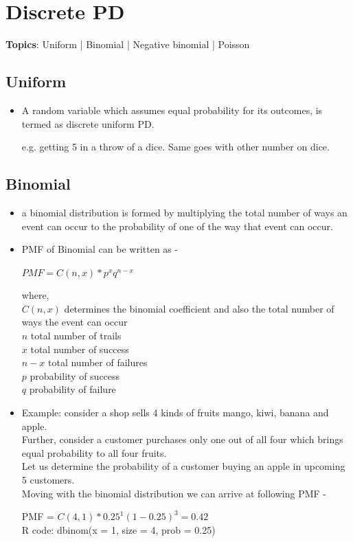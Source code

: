 \documentclass{article}
\begin{document}
\section{Discrete PD}
\textbf{Topics}: Uniform | Binomial | Negative binomial | Poisson

\subsection{Uniform}
\begin{itemize}
	\item A random variable which assumes equal probability for its outcomes, is termed as discrete uniform PD.
	
	e.g. getting 5 in a throw of a dice. Same goes with other number on dice.
\end{itemize}

\subsection{Binomial}
\begin{itemize}
	\item a binomial distribution is formed by multiplying the total number of ways an event can occur to the probability of one of the way that event can occur.
	
	\item PMF of Binomial can be written as -
	
	\begin{center}$PMF = C(n,x)*p^xq^{n-x}$ \end{center}
	
	where,\\
	
	$C(n,x)$ determines the binomial coefficient and also the total number of ways the event can occur\\
	$n$ total number of trails\\
	$x$ total number of success\\
	$n-x$ total number of failures\\
	$p$ probability of success\\
	$q$ probability of failure\\
	\item Example: consider a shop sells 4 kinds of fruits mango, kiwi, banana and apple. \\
	Further, consider a customer purchases only one out of all four which brings equal probability to all four fruits.\\
	Let us determine the probability of a customer buying an apple in upcoming 5 customers.\\
	Moving with the binomial distribution we can arrive at following PMF -\\
	\begin{center}
		PMF = $C(4,1)*0.25^1(1-0.25)^3=0.42$\\
		R code: dbinom(x = 1, size = 4, prob = 0.25)
	\end{center}
\end{itemize}
\end{document}
